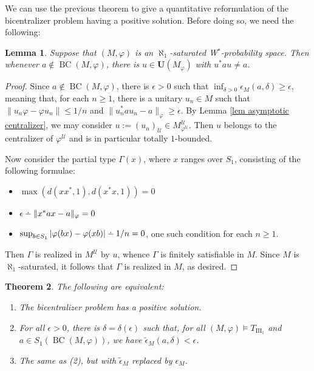 \documentclass[12pt]{amsart}
\makeatletter
\newtheorem{thm}{Theorem}[section]
\newtheorem{lem}[thm]{Lemma}
\theoremstyle{definition}
\def\cal{\mathcal}
\def\u{\mathsf 1}
\def\dotminussym#1#2{%
  \setbox0=\hbox{$\m@th#1-$}%
  \kern.5\wd0%
  \hbox to 0pt{\hss\hbox{$\m@th#1-$}\hss}%
  \raise.6\ht0\hbox to 0pt{\hss$\m@th#1.$\hss}%
  \kern.5\wd0}
\newcommand{\dotminus}{\mathbin{\mathpalette\dotminussym{}}}
\newcommand\cU{{\cal U}}
\def \u{\mathcal U}
\def\BC{\operatorname{BC}}
\makeatother
\begin{document}
We can use the previous theorem to give a quantitative reformulation of the bicentralizer problem having a positive solution.  Before doing so, we need the following:

\begin{lem}\label{saturatedlemma}
Suppose that $(M,\varphi)$ is an $\aleph_1$-saturated W$^*$-probability space.  Then whenever $a\notin \BC(M,\varphi)$, there is $u\in \mathbf{U}(M_\varphi)$ with $u^*au\not=a$.
\end{lem}

\begin{proof}
Since $a\notin \BC(M,\varphi)$, there is $\epsilon>0$ such that $\inf_{\delta>0}\epsilon_M(a,\delta)\geq \epsilon$, meaning that, for each $n\geq 1$, there is a unitary $u_n\in M$ such that $\|u_n\varphi-\varphi u_n\|\leq 1/n$ and $\|u_n^*au_n-a\|_\varphi \geq \epsilon$.  By Lemma \ref{lem asymptotic centralizer}, we may consider $u:=(u_n)_\u\in M^\cU_{\varphi^\u}$.  Then $u$ belongs to the centralizer of $\varphi^\u$ and is in particular totally $1$-bounded.

Now consider the partial type $\Gamma(x)$, where $x$ ranges over $S_1$, consisting of the following formulae:
\begin{itemize}
    \item $\max(d(xx^*,1),d(x^*x,1))=0$
    \item $\epsilon\dotminus \|x^*ax-a\|_\varphi=0$
    \item $\sup_{b\in S_1}|\varphi(bx)-\varphi(xb)|\dotminus 1/n=0$, one such condition for each $n\geq 1$.
\end{itemize}
Then $\Gamma$ is realized in $M^\u$ by $u$, whence $\Gamma$ is finitely satisfiable in $M$.  Since $M$ is $\aleph_1$-saturated, it follows that $\Gamma$ is realized in $M$, as desired.
\end{proof}

\begin{thm}\label{bicentzeroset}
The following are equivalent:
\begin{enumerate}
    \item The bicentralizer problem has a positive solution.
    \item For all $\epsilon>0$, there is $\delta=\delta(\epsilon)$ such that, for all $(M,\varphi)\models T_{\mathrm{III}_1}$ and $a\in S_1(\BC(M,\varphi))$, we have $\tilde{\epsilon}_M(a,\delta)<\epsilon$.
    \item The same as (2), but with $\tilde{\epsilon}_M$ replaced by $\epsilon_M$.
\end{enumerate}
\end{thm}
\end{document}
